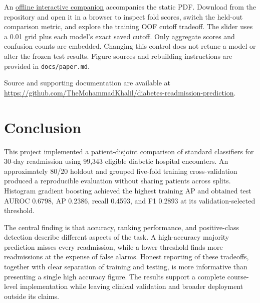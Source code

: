\documentclass[conference]{IEEEtran}
\begin{document}
An \href{https://github.com/TheMohammadKhalil/diabetes-readmission-prediction/blob/main/docs/interactive_results.html}{offline interactive companion} accompanies the static PDF. Download  from the repository and open it in a browser to inspect fold scores, switch the held-out comparison metric, and explore the training OOF cutoff tradeoff. The slider uses a 0.01 grid plus each model's exact saved cutoff. Only aggregate scores and confusion counts are embedded. Changing this control does not retune a model or alter the frozen test results. Figure sources and rebuilding instructions are provided in \texttt{docs/paper.md}.

Source and supporting documentation are available at
\url{https://github.com/TheMohammadKhalil/diabetes-readmission-prediction}.

\FloatBarrier
\section{Conclusion}
This project implemented a patient-disjoint comparison of standard classifiers for 30-day readmission using 99,343 eligible diabetic hospital encounters. An approximately 80/20 holdout and grouped five-fold training cross-validation produced a reproducible evaluation without sharing patients across splits. Histogram gradient boosting achieved the highest training AP and obtained test AUROC 0.6798, AP 0.2386, recall 0.4593, and F1 0.2893 at its validation-selected threshold.

The central finding is that accuracy, ranking performance, and positive-class detection describe different aspects of the task. A high-accuracy majority prediction misses every readmission, while a lower threshold finds more readmissions at the expense of false alarms. Honest reporting of these tradeoffs, together with clear separation of training and testing, is more informative than presenting a single high accuracy figure. The results support a complete course-level implementation while leaving clinical validation and broader deployment outside its claims.
\end{document}
